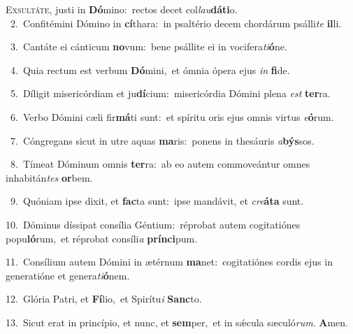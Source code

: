 \lettrine{\initial\textcolor{\initialcolor}{E}}{xsultáte,} justi in \textbf{Dó}\-mino:~\star rectos decet col\-\textit{lau}\-\textbf{dá}\textbf{ti}o.\\
{\numbfont\textcolor{\numbcolor}{~2.}}~Confitémini Dómino in \textbf{cí}\-thara:~\star in psaltério decem chordárum psálli\textit{te} \textbf{il}\-li.\par
{\numbfont\textcolor{\numbcolor}{~3.}}~Cantáte ei cánticum \textbf{no}\-vum:~\star bene psállite ei in vocifera\-\textit{ti}\-\textbf{ó}ne.\par
{\numbfont\textcolor{\numbcolor}{~4.}}~Quia rectum est verbum \textbf{Dó}\-mini,~\star et ómnia ópera ejus \textit{in} \textbf{fi}\-de.\par
{\numbfont\textcolor{\numbcolor}{~5.}}~Díligit misericórdiam et ju\-\textbf{dí}\-cium:~\star misericórdia Dómini plena \textit{est} \textbf{ter}\-ra.\par
{\numbfont\textcolor{\numbcolor}{~6.}}~Verbo Dómini cæli fir\-\textbf{má}\-ti sunt:~\star et spíritu oris ejus omnis virtus \textit{e}\-\textbf{ó}rum.\par
{\numbfont\textcolor{\numbcolor}{~7.}}~Cóngregans sicut in utre aquas \textbf{ma}\-ris:~\star ponens in thesáuris \textit{a}\-\textbf{býs}sos.\par
{\numbfont\textcolor{\numbcolor}{~8.}}~Tímeat Dóminum omnis \textbf{ter}\-ra:~\star ab eo autem commoveántur omnes inhabitán\textit{tes} \textbf{or}\-bem.\par
{\numbfont\textcolor{\numbcolor}{~9.}}~Quóniam ipse dixit, et \textbf{fac}\-ta sunt:~\star ipse mandávit, et \textit{cre}\-\textbf{á}\textbf{ta} sunt.\par
{\numbfont\textcolor{\numbcolor}{10.}}~Dóminus díssipat consília Géntium:~\dagger réprobat autem cogitatiónes popu\-\textbf{ló}\-rum,~\star et réprobat consíli\textit{a} \textbf{prín}\-\textbf{ci}pum.\par
{\numbfont\textcolor{\numbcolor}{11.}}~Consílium autem Dómini in ætérnum \textbf{ma}\-net:~\star cogitatiónes cordis ejus in generatióne et genera\-\textit{ti}\-\textbf{ó}nem.\par
{\numbfont\textcolor{\numbcolor}{12.}}~Glória Patri, et \textbf{Fí}\-lio,~\star et Spirítu\textit{i} \textbf{Sanc}\-to.\par
{\numbfont\textcolor{\numbcolor}{13.}}~Sicut erat in princípio, et nunc, et \textbf{sem}\-per,~\star et in sǽcula sæculó\-\textit{rum}\-. \textbf{A}\-men.\par
